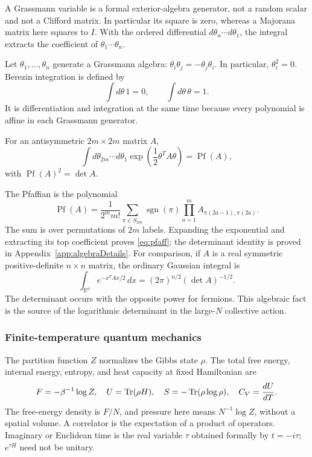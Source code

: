 \documentclass[11pt]{article}
\numberwithin{equation}{section}
\theoremstyle{exposition}
\theoremstyle{result}
\newcommand{\R}{\mathbb R}
\newcommand{\Pf}{\operatorname{Pf}}
\newcommand{\sgn}{\operatorname{sgn}}
\begin{document}
A Grassmann variable is a formal exterior-algebra generator, not a random scalar and not a Clifford matrix. In particular its square is zero, whereas a Majorana matrix here squares to $I$. With the ordered differential $d\theta_n\cdots d\theta_1$, the integral extracts the coefficient of $\theta_1\cdots\theta_n$.

Let $\theta_1,\ldots,\theta_n$ generate a Grassmann algebra: $\theta_i\theta_j=-\theta_j\theta_i$. In particular, $\theta_i^2=0$. Berezin integration is defined by
\begin{equation*}
\int d\theta\,1=0,
\qquad
\int d\theta\,\theta=1.
\end{equation*}
It is differentiation and integration at the same time because every polynomial is affine in each Grassmann generator.

For an antisymmetric $2m\times2m$ matrix $A$,
\begin{equation}
\int d\theta_{2m}\cdots d\theta_1
\exp\left(\frac12\theta^T A\theta\right)
=\Pf(A),
\label{eq:pfaff}
\end{equation}
with $\Pf(A)^2=\det A$.


The Pfaffian is the polynomial
\begin{equation*}
\Pf(A)=\frac1{2^m m!}\sum_{\pi\in S_{2m}}\sgn(\pi)
\prod_{a=1}^m A_{\pi(2a-1),\pi(2a)}.
\end{equation*}
The sum is over permutations of $2m$ labels. Expanding the exponential and extracting its top coefficient proves \eqref{eq:pfaff}; the determinant identity is proved in Appendix~\ref{app:algebraDetails}. For comparison, if $A$ is a real symmetric positive-definite $n\times n$ matrix, the ordinary Gaussian integral is
\begin{equation*}
\int_{\R^n}e^{-x^TAx/2}\,dx
=(2\pi)^{n/2}(\det A)^{-1/2}.
\end{equation*}
The determinant occurs with the opposite power for fermions. This algebraic fact is the source of the logarithmic determinant in the large-$N$ collective action.

\subsubsection{Finite-temperature quantum mechanics}


The partition function $Z$ normalizes the Gibbs state $\rho$. The total free energy, internal energy, entropy, and heat capacity at fixed Hamiltonian are
\begin{equation*}
F=-\beta^{-1}\log Z,\quad U=\Tr(\rho H),\quad
S=-\Tr(\rho\log\rho),\quad C_V=\frac{dU}{dT}.
\end{equation*}
The free-energy density is $F/N$, and pressure here means $N^{-1}\log Z$, without a spatial volume. A correlator is the expectation of a product of operators. Imaginary or Euclidean time is the real variable $\tau$ obtained formally by $t=-i\tau$; $e^{\tau H}$ need not be unitary.
\end{document}
